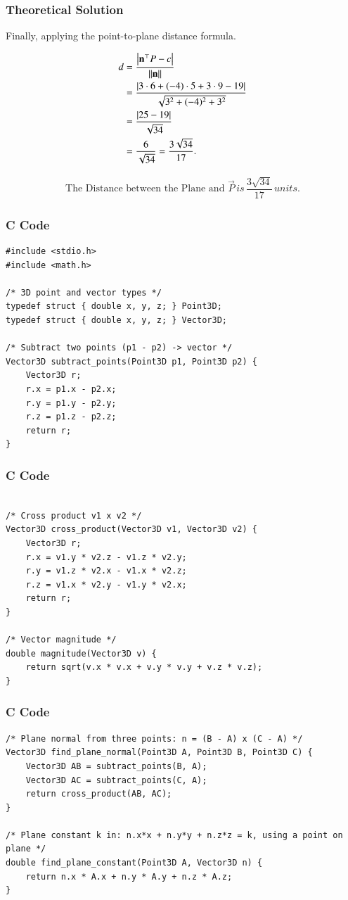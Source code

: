 \documentclass{beamer}
\begin{document}
\begin{frame}[fragile]
    \frametitle{Theoretical Solution}
Finally, applying the point-to-plane distance formula.

\begin{align}
d &= \frac{\left\vert\mathbf{n}^\top P - c\right\vert}{\left\lVert\mathbf{n}\right\rVert}\\
&= \frac{\left\vert3\cdot 6+(-4)\cdot 5+3\cdot 9-19\right\vert}{\sqrt{3^2+(-4)^2+3^2}}\\
&= \frac{\left\vert25-19\right\vert}{\sqrt{34}}\\
&= \frac{6}{\sqrt{34}}=\frac{3\sqrt{34}}{17}.
\end{align}

\begin{align}
    \boxed{\text{The Distance between the Plane and } \vec{P} \, is \, \dfrac{3\sqrt{34}}{17} \, units.}
\end{align}
\end{frame}


\begin{frame}[fragile]
    \frametitle{C Code}
    \begin{lstlisting}
#include <stdio.h>
#include <math.h>

/* 3D point and vector types */
typedef struct { double x, y, z; } Point3D;
typedef struct { double x, y, z; } Vector3D;

/* Subtract two points (p1 - p2) -> vector */
Vector3D subtract_points(Point3D p1, Point3D p2) {
    Vector3D r;
    r.x = p1.x - p2.x;
    r.y = p1.y - p2.y;
    r.z = p1.z - p2.z;
    return r;
}
    \end{lstlisting}
\end{frame}

\begin{frame}[fragile]
    \frametitle{C Code}
    \begin{lstlisting}

/* Cross product v1 x v2 */
Vector3D cross_product(Vector3D v1, Vector3D v2) {
    Vector3D r;
    r.x = v1.y * v2.z - v1.z * v2.y;
    r.y = v1.z * v2.x - v1.x * v2.z;
    r.z = v1.x * v2.y - v1.y * v2.x;
    return r;
}

/* Vector magnitude */
double magnitude(Vector3D v) {
    return sqrt(v.x * v.x + v.y * v.y + v.z * v.z);
}
    \end{lstlisting}
\end{frame}

\begin{frame}[fragile]
    \frametitle{C Code}
    \begin{lstlisting}
/* Plane normal from three points: n = (B - A) x (C - A) */
Vector3D find_plane_normal(Point3D A, Point3D B, Point3D C) {
    Vector3D AB = subtract_points(B, A);
    Vector3D AC = subtract_points(C, A);
    return cross_product(AB, AC);
}

/* Plane constant k in: n.x*x + n.y*y + n.z*z = k, using a point on plane */
double find_plane_constant(Point3D A, Vector3D n) {
    return n.x * A.x + n.y * A.y + n.z * A.z;
}
    \end{lstlisting}
\end{frame}
\end{document}
